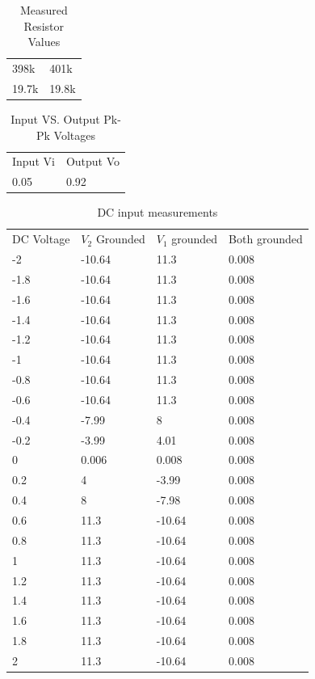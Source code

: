 \documentclass[12pt]{article}
\begin{document}
\begin{table}[!h]
	\centering
	\caption{Measured Resistor Values}
	\label{my-label}
	\begin{tabular}{ll}
		398k  & 401k  \\
		19.7k & 19.8k
	\end{tabular}
\end{table}

\begin{table}[h!]
	\centering
	\caption{Input VS. Output Pk-Pk Voltages}
	\label{my-label}
	\begin{tabular}{ll}
		Input Vi & Output Vo \\
		0.05     & 0.92     
	\end{tabular}
\end{table}

\begin{table}[!h]
	\centering
	\caption{DC input measurements}
	\label{my-label}
	\begin{tabular}{llll}
		DC Voltage & $V_2$ Grounded & $V_1$ grounded & Both grounded \\
		-2   & -10.64 & 11.3   & 0.008 \\
		-1.8 & -10.64 & 11.3   & 0.008 \\
		-1.6 & -10.64 & 11.3   & 0.008 \\
		-1.4 & -10.64 & 11.3   & 0.008 \\
		-1.2 & -10.64 & 11.3   & 0.008 \\
		-1   & -10.64 & 11.3   & 0.008 \\
		-0.8 & -10.64 & 11.3   & 0.008 \\
		-0.6 & -10.64 & 11.3   & 0.008 \\
		-0.4 & -7.99  & 8      & 0.008 \\
		-0.2 & -3.99  & 4.01   & 0.008 \\
		0    & 0.006  & 0.008  & 0.008 \\
		0.2  & 4      & -3.99  & 0.008 \\
		0.4  & 8      & -7.98  & 0.008 \\
		0.6  & 11.3   & -10.64 & 0.008 \\
		0.8  & 11.3   & -10.64 & 0.008 \\
		1    & 11.3   & -10.64 & 0.008 \\
		1.2  & 11.3   & -10.64 & 0.008 \\
		1.4  & 11.3   & -10.64 & 0.008 \\
		1.6  & 11.3   & -10.64 & 0.008 \\
		1.8  & 11.3   & -10.64 & 0.008 \\
		2    & 11.3   & -10.64 & 0.008
	\end{tabular}
\end{table}
\end{document}
